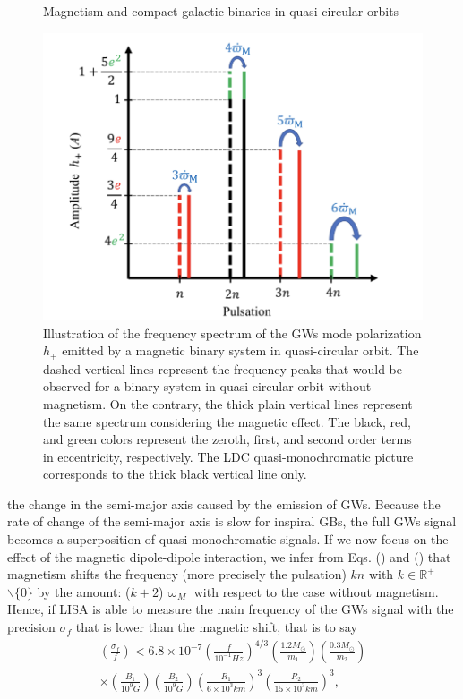 \documentclass[a4paper,10.5pt]{article}
\begin{document}
\begin{figure}[H]
    \centering
    \caption{Magnetism and compact galactic binaries in quasi-circular orbits}
    \includegraphics[scale=0.5]{Figura 1.png}
    \caption{Illustration of the frequency spectrum of the GWs mode polarization $h_+$ emitted by a magnetic binary system in quasi-circular orbit. The dashed vertical lines represent the frequency peaks that would be observed for a binary system in quasi-circular orbit without magnetism. On the contrary, the thick plain vertical lines represent the same spectrum considering the magnetic effect. The black, red, and green colors represent the zeroth, first, and second order terms in eccentricity, respectively. The LDC quasi-monochromatic picture corresponds to the thick black vertical line only.
}
    \label{Figura 1}
\end{figure}
the change in the semi-major axis caused by the emission of GWs. Because the rate of change of the semi-major axis is slow for inspiral GBs, the full GWs signal becomes a superposition of quasi-monochromatic signals. If we now focus on the effect of the magnetic dipole-dipole interaction, we infer from Eqs. () and () that magnetism shifts the frequency (more precisely the pulsation) $kn$ with $k\in\mathbb{R}^+$ $\backslash\{0\}$ by the amount: ($k+2$)$\varpi_M$ with respect to the case without magnetism. Hence, if LISA is able to measure the main frequency of the GWs signal with the precision $\sigma_f$ that is lower than the magnetic shift, that is to say
\begin{equation} \tag{2.6}
\begin{split}
\left(\frac{\sigma_f}{f}\right) < 6.8 \times 10^{-7}\left(\frac{f}{10^{-1}Hz}\right)^{4/3}\left(\frac{1.2M_\odot}{m_1}\right) \left(\frac{0.3M_\odot}{m_2}\right)\\ \times\left(\frac{B_1}{10^9G}\right)\left(\frac{B_2}{10^9G}\right) \left(\frac{R_1}{6\times10^3km}\right)^3 \left(\frac{R_2}{15\times 10^3km} \right)^3,
\end{split}
\end{equation}
\end{document}

